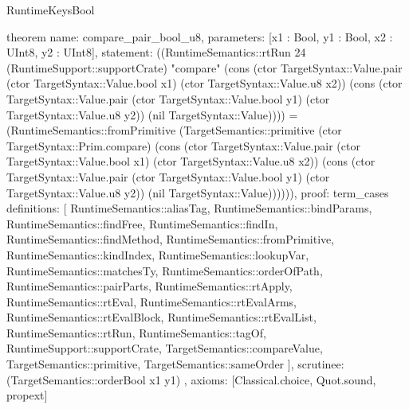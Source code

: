 \begin{lexlean}{RuntimeKeysBool}
\begin{semanticmodule}
theorem{
  name: compare_pair_bool_u8,
  parameters: [x1 : Bool, y1 : Bool, x2 : UInt8, y2 : UInt8],
  statement: ((RuntimeSemantics::rtRun 24 (RuntimeSupport::supportCrate) "compare" (cons (ctor TargetSyntax::Value.pair (ctor TargetSyntax::Value.bool x1) (ctor TargetSyntax::Value.u8 x2)) (cons (ctor TargetSyntax::Value.pair (ctor TargetSyntax::Value.bool y1) (ctor TargetSyntax::Value.u8 y2)) (nil TargetSyntax::Value)))) = (RuntimeSemantics::fromPrimitive (TargetSemantics::primitive (ctor TargetSyntax::Prim.compare) (cons (ctor TargetSyntax::Value.pair (ctor TargetSyntax::Value.bool x1) (ctor TargetSyntax::Value.u8 x2)) (cons (ctor TargetSyntax::Value.pair (ctor TargetSyntax::Value.bool y1) (ctor TargetSyntax::Value.u8 y2)) (nil TargetSyntax::Value)))))),
  proof: term_cases{
    definitions: [
      RuntimeSemantics::aliasTag,
      RuntimeSemantics::bindParams,
      RuntimeSemantics::findFree,
      RuntimeSemantics::findIn,
      RuntimeSemantics::findMethod,
      RuntimeSemantics::fromPrimitive,
      RuntimeSemantics::kindIndex,
      RuntimeSemantics::lookupVar,
      RuntimeSemantics::matchesTy,
      RuntimeSemantics::orderOfPath,
      RuntimeSemantics::pairParts,
      RuntimeSemantics::rtApply,
      RuntimeSemantics::rtEval,
      RuntimeSemantics::rtEvalArms,
      RuntimeSemantics::rtEvalBlock,
      RuntimeSemantics::rtEvalList,
      RuntimeSemantics::rtRun,
      RuntimeSemantics::tagOf,
      RuntimeSupport::supportCrate,
      TargetSemantics::compareValue,
      TargetSemantics::primitive,
      TargetSemantics::sameOrder
    ],
    scrutinee: (TargetSemantics::orderBool x1 y1)
  },
  axioms: [Classical.choice, Quot.sound, propext]
}


\end{semanticmodule}
\end{lexlean}
